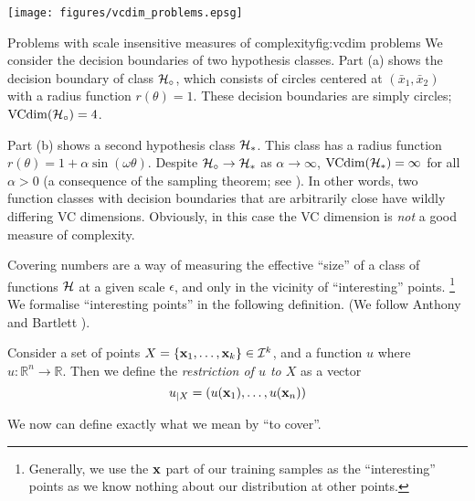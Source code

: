 \begin{linefigure}
\begin{center}
\texttt{[image: figures/vcdim\_problems.epsg]}
\end{center}
\begin{capt}{Problems with scale insensitive measures of
complexity}{fig:vcdim problems}
We consider the decision boundaries of two hypothesis classes.  Part
(a) shows the decision boundary of class $\mathcal{H}_{\circ}$,
which consists of circles centered at $(\bar{x}_1, \bar{x}_2)$ with a
radius function $r(\theta) = 1$.  These decision boundaries are simply
circles; $\mathrm{VCdim}(\mathcal{H}_{\circ}) = 4$.

Part (b) shows a second hypothesis class $\mathcal{H}_{\ast}$.  This class
has a radius function $r(\theta) = 1 + \alpha \sin(\omega \theta)$.
Despite $\mathcal{H}_{\circ} \rightarrow \mathcal{H}_{\ast}$ as $\alpha
\rightarrow \infty$, $\mathrm{VCdim}(\mathcal{H}_{\ast}) = \infty$ for all $\alpha >
0$ (a consequence of the sampling theorem; see \cite{Cherkassky98}).
In other words, two function classes with 
decision boundaries that are arbitrarily close have wildly differing
VC dimensions.  Obviously, in this case the VC dimension is \emph{not} a
good measure of complexity.
\end{capt}
\end{linefigure}

Covering numbers are a way of measuring the effective ``size'' of a
class of functions $\mathcal{H}$ at a given scale $\epsilon$, and only
in the vicinity of ``interesting'' points.%
\footnote{Generally, we use the $\mathbf{x}$ part of our training samples as
the ``interesting'' points as we know nothing about our distribution
at other points.}
We formalise ``interesting points'' in the following definition.  (We
follow Anthony and Bartlett \cite{Anthony98}).

\begin{definition}
\label{def:restriction}
Consider a set of points $X = \{\mathbf{x}_1, \ldots, \mathbf{x}_k\} \in \mathcal{I}^k$,
and a function $u$ where $u : \mathbb{R}^n \rightarrow \mathbb{R}$.  Then
we define the \emph{restriction of $u$ to $X$} as a vector
%
\begin{equation}
u_{|X} = (u(\mathbf{x}_1), \ldots, u(\mathbf{x}_n))
\end{equation}
\end{definition}

We now can define exactly what we mean by ``to cover''.

